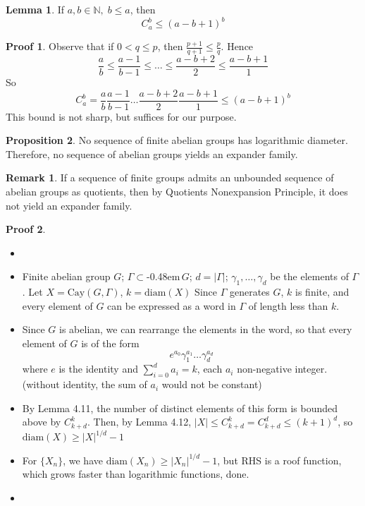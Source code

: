 \documentclass{book}
\newcommand{\N}{\mathbb{N}}
\newcommand{\syin}{$\subset$\kern-0.48em\raisebox{.20ex}{\tiny S}$\,$}
\newcommand{\diam}[1]{\textrm{diam}( #1 )}
\newcommand{\abs}[1]{\lvert #1 \rvert }
\newcommand{\Cay}[1]{\textrm{Cay}( #1 )}
\theoremstyle{definition}
\newtheorem{lemma}{Lemma}[chapter]
\newtheorem{proposition}[lemma]{Proposition}
\theoremstyle{remarkstyle}
\newtheorem*{remark}{Remark}%
\newtheorem*{myproof}{Proof}%
\begin{document}
\begin{lemma}
    If $a,b \in \N, \; b\le a $, then $$
    C^{b}_{a} \le (a-b+1)^{b}
    $$ 
\end{lemma}
\begin{myproof}
    Observe that if $0 < q \le p$, then $\frac{p+1}{q+1} \le \frac{p}{q} $. Hence 
    $$
    \frac{a}{b} \le \frac{a-1}{b-1} \le \dots \le \frac{a-b+2}{2} \le \frac{a-b+1}{1}
    $$ 
    So $$
    C^{b}_{a} = \frac{a}{b}\frac{a-1}{b-1}\dots\frac{a-b+2}{2}\frac{a-b+1}{1} \le (a-b+1)^{b}
    $$ 
    This bound is not sharp, but suffices for our purpose. \newline
\end{myproof}


\begin{proposition}
    No sequence of finite abelian groups has logarithmic diameter. Therefore, no sequence of abelian groups yields an expander family.
\end{proposition}
\begin{remark}
    If a sequence of finite groups admits an unbounded sequence of abelian groups as quotients, then by Quotients Nonexpansion Principle, it does not yield an expander family.
\end{remark}
\begin{myproof}
    \begin{itemize}
        \item[]
        \item Finite abelian group $G$; $\Gamma$\syin$G$; $d=\abs{\Gamma}$; $\gamma_{1}, \dots, \gamma_{d} $ be the elements of $\Gamma$. Let $X=\Cay{G,\Gamma}$, $k=\diam{X}$ Since $\Gamma$ generates $G$, $k$ is finite, and every element of $G$ can be expressed as a word in $\Gamma$ of length less than $k$.
        \item Since $G$ is abelian, we can rearrange the elements in the word, so that every element of $G$ is of the form $$
        e^{a_{0}}\gamma^{a_{1}}_{1}\dots\gamma^{a_{d}}_{d}
        $$
        where $e$ is the identity and $\sum^{d}_{i=0}a_{i}=k $, each $a_{i} $ non-negative integer. (without identity, the sum of $a_{i} $ would not be constant)
        \item By Lemma 4.11, the number of distinct elements of this form is bounded above by $C^{k}_{k+d} $. Then, by Lemma 4.12, $\abs{X} \le C^{k}_{k+d} = C^{d}_{k+d} \le (k+1)^{d} $, so $\diam{X} \ge \abs{X}^{1/d}-1 $
        \item For $\{X_{n}\} $, we have $\diam{X_{n}}\ge \abs{X_{n}}^{1/d}-1 $, but RHS is a roof function, which grows faster than logarithmic functions, done.
        \item[] 
    \end{itemize}
\end{myproof}
\end{document}
